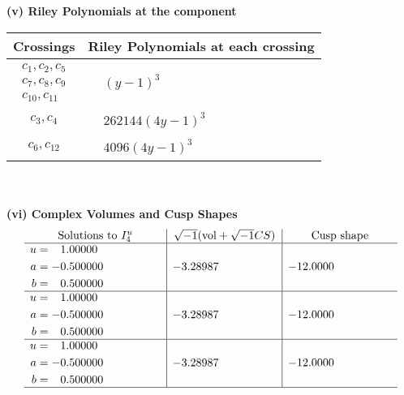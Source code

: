 \documentclass[1p]{elsarticle_modified}
\theoremstyle{definition}
\newcommand{\I}{\sqrt{-1}}
\begin{document}
\newpage\renewcommand{\arraystretch}{1}
\flushleft \textbf{(v) Riley Polynomials at the component}\newline \\
\begin{tabular}{m{50pt}|m{274pt}}
Crossings & \hspace{64pt}Riley Polynomials at each crossing \\
\hline $$\begin{aligned}c_{1},c_{2},c_{5}\\c_{7},c_{8},c_{9}\\c_{10},c_{11}\end{aligned}$$&$\begin{aligned}
&(y-1)^3
\end{aligned}$\\
\hline $$\begin{aligned}c_{3},c_{4}\end{aligned}$$&$\begin{aligned}
&262144(4 y-1)^3
\end{aligned}$\\
\hline $$\begin{aligned}c_{6},c_{12}\end{aligned}$$&$\begin{aligned}
&4096(4 y-1)^3
\end{aligned}$\\
\hline
\end{tabular}\\~\\
\newpage\flushleft \textbf{(vi) Complex Volumes and Cusp Shapes}
$$\begin{array}{c|c|c}  
\text{Solutions to }I^u_{4}& \I (\text{vol} + \sqrt{-1}CS) & \text{Cusp shape}\\
 \hline 
\begin{aligned}
u &= \phantom{-}1.00000\phantom{ +0.000000I} \\
a &= -0.500000\phantom{ +0.000000I} \\
b &= \phantom{-}0.500000\phantom{ +0.000000I}\end{aligned}
 & -3.28987\phantom{ +0.000000I} & -12.0000\phantom{ +0.000000I} \\ \hline\begin{aligned}
u &= \phantom{-}1.00000\phantom{ +0.000000I} \\
a &= -0.500000\phantom{ +0.000000I} \\
b &= \phantom{-}0.500000\phantom{ +0.000000I}\end{aligned}
 & -3.28987\phantom{ +0.000000I} & -12.0000\phantom{ +0.000000I} \\ \hline\begin{aligned}
u &= \phantom{-}1.00000\phantom{ +0.000000I} \\
a &= -0.500000\phantom{ +0.000000I} \\
b &= \phantom{-}0.500000\phantom{ +0.000000I}\end{aligned}
 & -3.28987\phantom{ +0.000000I} & -12.0000\phantom{ +0.000000I}\\
 \hline 
 \end{array}$$\newpage\newpage\renewcommand{\arraystretch}{1}
\end{document}
